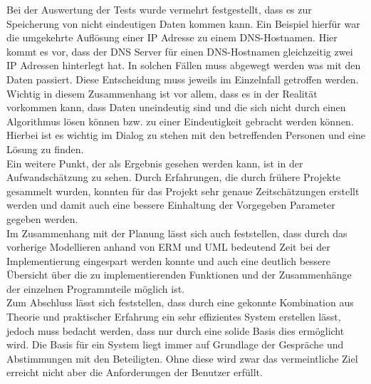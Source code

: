 Bei der Auswertung der Tests wurde vermehrt festgestellt, dass es zur Speicherung von nicht eindeutigen Daten kommen kann. Ein Beispiel hierfür war die umgekehrte Auflösung einer IP Adresse zu einem DNS-Hostnamen. Hier kommt es vor, dass der DNS Server für einen DNS-Hostnamen gleichzeitig zwei IP Adressen hinterlegt hat. In solchen Fällen muss abgewegt werden was mit den Daten passiert. Diese Entscheidung muss jeweils im Einzelnfall getroffen werden. Wichtig in diesem Zusammenhang ist vor allem, dass es in der Realität vorkommen kann, dass Daten uneindeutig sind und die sich nicht durch einen Algorithmus lösen können bzw. zu einer Eindeutigkeit gebracht werden können. Hierbei ist es wichtig im Dialog zu stehen mit den betreffenden Personen und eine Lösung zu finden.\\
Ein weitere Punkt, der als Ergebnis gesehen werden kann, ist in der Aufwandschätzung zu sehen. Durch Erfahrungen, die durch frühere Projekte gesammelt wurden, konnten für das Projekt sehr genaue Zeitschätzungen erstellt werden und damit auch eine bessere Einhaltung der Vorgegeben Parameter gegeben werden.\\
Im Zusammenhang mit der Planung lässt sich auch feststellen, dass durch das vorherige Modellieren anhand von ERM und UML bedeutend Zeit bei der Implementierung eingespart werden konnte und auch eine deutlich bessere Übersicht über die zu implementierenden Funktionen und der Zusammenhänge der einzelnen Programmteile möglich ist.\\
Zum Abschluss lässt sich feststellen, dass durch eine gekonnte Kombination aus Theorie und praktischer Erfahrung ein sehr effizientes System erstellen lässt, jedoch muss bedacht werden, dass nur durch eine solide Basis dies ermöglicht wird. Die Basis für ein System liegt immer auf Grundlage der Gespräche und Abstimmungen mit den Beteiligten. Ohne diese wird zwar das vermeintliche Ziel erreicht nicht aber die Anforderungen der Benutzer erfüllt.